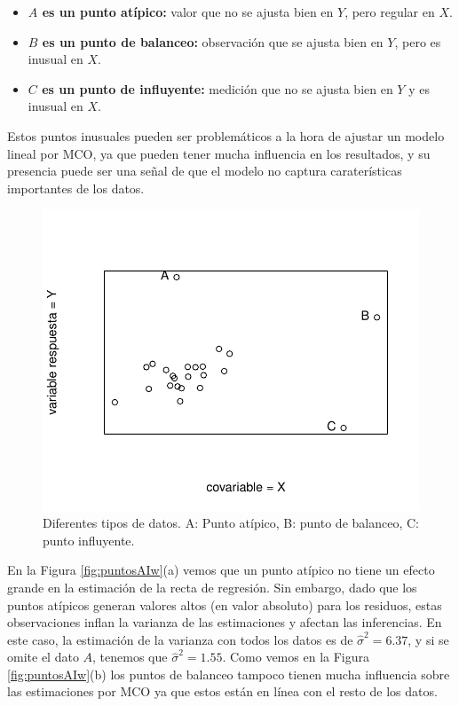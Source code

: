 \documentclass[
]{article}
\providecommand{\tightlist}{%
  \setlength{\itemsep}{0pt}\setlength{\parskip}{0pt}}
\begin{document}
\begin{itemize}
\tightlist
\item
  \textbf{\(A\) es un punto atípico:} valor que no se ajusta bien en \(Y\), pero regular en \(X\).
\item
  \textbf{\(B\) es un punto de balanceo:} observación que se ajusta bien en \(Y\), pero es inusual en \(X\).
\item
  \textbf{\(C\) es un punto de influyente:} medición que no se ajusta bien en \(Y\) y es inusual en \(X\).
\end{itemize}

Estos puntos inusuales pueden ser problemáticos a la hora de ajustar un modelo lineal por MCO, ya que pueden tener mucha influencia en los resultados, y su presencia puede ser una señal de que el modelo no captura caraterísticas importantes de los datos.

\begin{figure}

{\centering \includegraphics{MLGI_files/figure-latex/puntosAI-1} 

}

\caption{Diferentes tipos de datos. A: Punto atípico, B: punto de balanceo, C: punto influyente.}\label{fig:puntosAI}
\end{figure}

En la Figura \ref{fig:puntosAIw}(a) vemos que un punto atípico no tiene un efecto grande en la estimación de la recta de regresión. Sin embargo, dado que los puntos atípicos generan valores altos (en valor absoluto) para los residuos, estas observaciones inflan la varianza de las estimaciones y afectan las inferencias. En este caso, la estimación de la varianza con todos los datos es de \(\widehat{\sigma}^{2}=6.37\), y si se omite el dato \(A\), tenemos que \(\widehat{\sigma}^{2}=1.55\). Como vemos en la Figura \ref{fig:puntosAIw}(b) los puntos de balanceo tampoco tienen mucha influencia sobre las estimaciones por MCO ya que estos están en línea con el resto de los datos.
\end{document}

